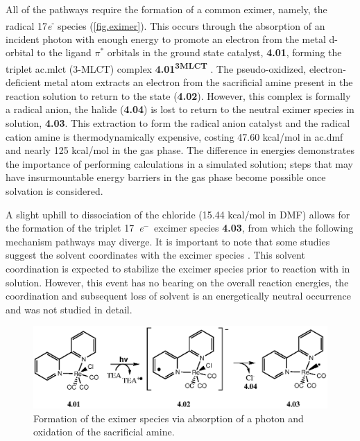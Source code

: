All of the pathways require the formation of a common eximer, namely, the radical 17\textit{e}\textsuperscript{-} species (\autoref{fig.eximer}). This occurs through the absorption of an incident photon with enough energy to promote an electron from the metal d-orbital to the ligand $\pi^\ast$ orbitals in the ground state catalyst, \textbf{4.01}, forming the triplet \acrlong{ac.mlct} (3-MLCT) complex \textbf{4.01\textsuperscript{3MLCT}} . The pseudo-oxidized, electron-deficient metal atom extracts an electron from the sacrificial amine present in the reaction solution to return to the  state (\textbf{4.02}). However, this complex is formally a radical anion, the halide (\textbf{4.04}) is lost to return to the neutral eximer species in solution, \textbf{4.03}. This extraction to form the radical anion catalyst and the radical cation amine is thermodynamically expensive, costing 47.60 kcal/mol in \gls{ac.dmf} and nearly 125 kcal/mol in the gas phase. The difference in energies demonstrates the importance of performing calculations in a simulated solution; steps that may have insurmountable energy barriers in the gas phase become possible once solvation is considered.

A slight uphill to dissociation of the chloride (15.44 kcal/mol in DMF) allows for the formation of the triplet 17~\textit{e}$^-$~excimer species \textbf{4.03}, from which the following mechanism pathways may diverge. It is important to note that some studies suggest the solvent coordinates with the excimer species \autocite{morris2009, kou2014}. This solvent coordination is expected to stabilize the excimer species prior to reaction with  in solution. However, this event has no bearing on the overall reaction energies, the coordination and subsequent loss of solvent is an energetically neutral occurrence and was not studied in detail.

\begin{figure}[!htb]
 \begin{center}
  \includegraphics[clip=true, width=120mm, keepaspectratio]{images/eximer.eps}
 \end{center}
\caption{Formation of the eximer species via absorption of a photon and oxidation of the sacrificial amine.}
\label{fig.eximer}
\end{figure} 

